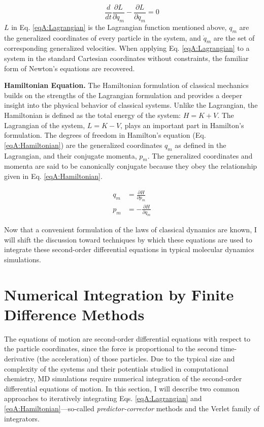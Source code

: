 \begin{equation}
   \frac d {dt} \frac {\partial L} {\partial \dot q_m} - \frac {\partial L}
         {\partial q_m} = 0
   \label{eqA:Lagrangian}
\end{equation}
$L$ in Eq. \ref{eqA:Lagrangian} is the Lagrangian function mentioned above,
$q_m$ are the generalized coordinates of every particle in the system, and $\dot
q_m$ are the set of corresponding generalized velocities. When applying Eq.
\ref{eqA:Lagrangian} to a system in the standard Cartesian coordinates without
constraints, the familiar form of Newton's equations are recovered.
\cite{CorbenClassicalMechanics}

\textbf{Hamiltonian Equation.} The Hamiltonian formulation of classical
mechanics builds on the strengths of the Lagrangian formulation and provides a
deeper insight into the physical behavior of classical systems. Unlike the
Lagrangian, the Hamiltonian is defined as the total energy of the system: $H = K
+ V$. The Lagrangian of the system, $L = K - V$, plays an important part in
Hamilton's formulation. The degrees of freedom in Hamilton's equation (Eq.
\ref{eqA:Hamiltonian}) are the generalized coordinates $q_m$ as defined in the
Lagrangian, and their conjugate momenta, $p_m$. The generalized coordinates and
momenta are said to be canonically conjugate because they obey the relationship
given in Eq. \ref{eqA:Hamiltonian}. \cite{CorbenClassicalMechanics}

\begin{align}
   q_m & = \frac {\partial H} {\partial p_m} \nonumber \\
   p_m & = - \frac {\partial H} {\partial q_m}
   \label{eqA:Hamiltonian}
\end{align}

Now that a convenient formulation of the laws of classical dynamics are known, I
will shift the discussion toward techniques by which these equations are used to
integrate these second-order differential equations in typical molecular
dynamics simulations.

\section{Numerical Integration by Finite Difference Methods}

The equations of motion are second-order differential equations with respect to
the particle coordinates, since the force is proportional to the second
time-derivative (\ie the acceleration) of those particles. Due to the typical
size and complexity of the systems and their potentials studied in computational
chemistry, MD simulations require numerical integration of the second-order
differential equations of motion. In this section, I will describe two common
approaches to iteratively integrating Eqs. \ref{eqA:Lagrangian} and
\ref{eqA:Hamiltonian}---so-called \emph{predictor-corrector} methods and the
Verlet family of integrators.

